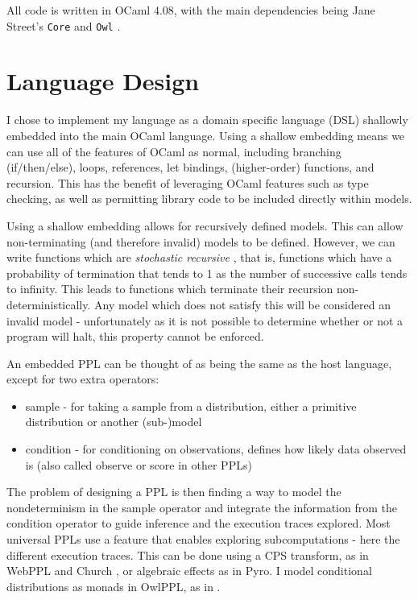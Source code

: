 All code is written in OCaml 4.08, with the main dependencies being Jane Street's \texttt{Core} and \texttt{Owl} \cite{owl}.	
	
\section{Language Design}
I chose to implement my language as a domain specific language (DSL) shallowly embedded into the main OCaml language. Using a shallow embedding means we can use all of the features of OCaml as normal, including branching (if/then/else), loops, references, let bindings, (higher-order) functions, and recursion. This has the benefit of leveraging OCaml features such as type checking, as well as permitting library code to be included directly within models.

Using a shallow embedding allows for recursively defined models. This can allow non-terminating (and therefore invalid) models to be defined. However, we can write functions which are \textit{stochastic recursive} \cite{siegmund}, that is, functions which have a probability of termination that tends to 1 as the number of successive calls tends to infinity. This leads to functions which terminate their recursion non-deterministically. Any model which does not satisfy this will be considered an invalid model - unfortunately as it is not possible to determine whether or not a program will halt, this property cannot be enforced. 
	
An embedded PPL can be thought of as being the same as the host language, except for two extra operators:
\begin{itemize}
	\item sample - for taking a sample from a distribution, either a primitive distribution or another (sub-)model
	\item condition - for conditioning on observations, defines how likely data observed is (also called observe or score in other PPLs)
\end{itemize}
The problem of designing a PPL is then finding a way to model the nondeterminism in the sample operator and integrate the information from the condition operator to guide inference and the execution traces explored. Most universal PPLs use a feature that enables exploring subcomputations - here the different execution traces. This can be done using a CPS transform, as in WebPPL and Church \cite{mobus2018structure,goodman2012church}, or algebraic effects as in Pyro\cite{bingham2019pyro}. I model conditional distributions as monads in OwlPPL, as in \cite{scibior2015practical}.
	
